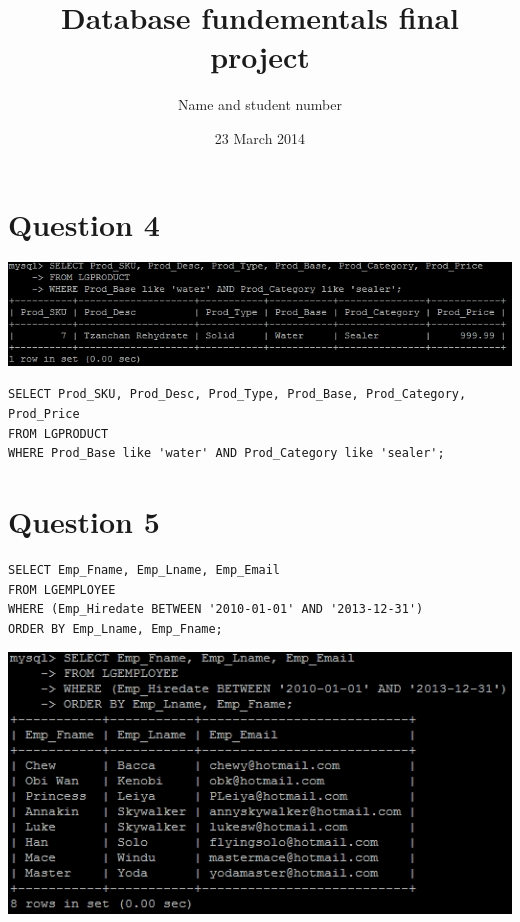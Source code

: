 \documentclass[a4paper,10pt]{article}
\title{Database fundementals final project}
\author{Name and student number}
\date{23 March 2014}
\begin{document}
\section {Question 4}
\includegraphics{Queries/Question_4/Q4_screenshot.jpg}
\lstset{
            language=SQL,
            breaklines=true
            }
        \begin{lstlisting}[frame=single]
        SELECT Prod_SKU, Prod_Desc, Prod_Type, Prod_Base, Prod_Category, Prod_Price
FROM LGPRODUCT
WHERE Prod_Base like 'water' AND Prod_Category like 'sealer';

        \end{lstlisting}
\section {Question 5}
\lstset{
            language=SQL,
            breaklines=true
            }
        \begin{lstlisting}[frame=single]
        SELECT Emp_Fname, Emp_Lname, Emp_Email
FROM LGEMPLOYEE
WHERE (Emp_Hiredate BETWEEN '2010-01-01' AND '2013-12-31')
ORDER BY Emp_Lname, Emp_Fname;

        \end{lstlisting}
\includegraphics{Queries/Question_5/Q5_screenshot.jpg}
\end{document}
